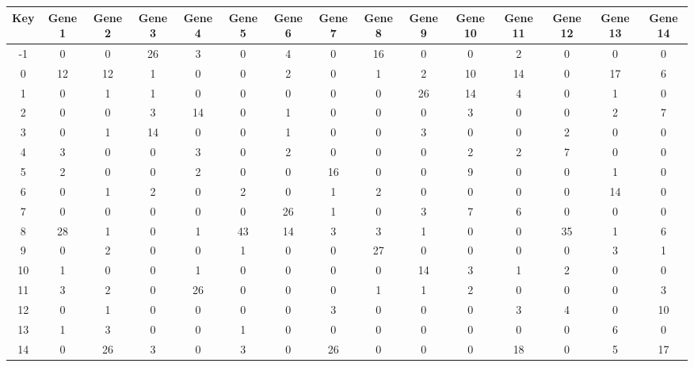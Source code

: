 \begin{tabular}{|c|c|c|c|c|c|c|c|c|c|c|c|c|c|c|}
\hline
Key & Gene 1 & Gene 2 & Gene 3 & Gene 4 & Gene 5 & Gene 6 & Gene 7 & Gene 8 & Gene 9 & Gene 10 & Gene 11 & Gene 12 & Gene 13 & Gene 14 \\
\hline
-1 & 0 & 0 & 26 & 3 & 0 & 4 & 0 & 16 & 0 & 0 & 2 & 0 & 0 & 0 \\
0 & 12 & 12 & 1 & 0 & 0 & 2 & 0 & 1 & 2 & 10 & 14 & 0 & 17 & 6 \\
1 & 0 & 1 & 1 & 0 & 0 & 0 & 0 & 0 & 26 & 14 & 4 & 0 & 1 & 0 \\
2 & 0 & 0 & 3 & 14 & 0 & 1 & 0 & 0 & 0 & 3 & 0 & 0 & 2 & 7 \\
3 & 0 & 1 & 14 & 0 & 0 & 1 & 0 & 0 & 3 & 0 & 0 & 2 & 0 & 0 \\
4 & 3 & 0 & 0 & 3 & 0 & 2 & 0 & 0 & 0 & 2 & 2 & 7 & 0 & 0 \\
5 & 2 & 0 & 0 & 2 & 0 & 0 & 16 & 0 & 0 & 9 & 0 & 0 & 1 & 0 \\
6 & 0 & 1 & 2 & 0 & 2 & 0 & 1 & 2 & 0 & 0 & 0 & 0 & 14 & 0 \\
7 & 0 & 0 & 0 & 0 & 0 & 26 & 1 & 0 & 3 & 7 & 6 & 0 & 0 & 0 \\
8 & 28 & 1 & 0 & 1 & 43 & 14 & 3 & 3 & 1 & 0 & 0 & 35 & 1 & 6 \\
9 & 0 & 2 & 0 & 0 & 1 & 0 & 0 & 27 & 0 & 0 & 0 & 0 & 3 & 1 \\
10 & 1 & 0 & 0 & 1 & 0 & 0 & 0 & 0 & 14 & 3 & 1 & 2 & 0 & 0 \\
11 & 3 & 2 & 0 & 26 & 0 & 0 & 0 & 1 & 1 & 2 & 0 & 0 & 0 & 3 \\
12 & 0 & 1 & 0 & 0 & 0 & 0 & 3 & 0 & 0 & 0 & 3 & 4 & 0 & 10 \\
13 & 1 & 3 & 0 & 0 & 1 & 0 & 0 & 0 & 0 & 0 & 0 & 0 & 6 & 0 \\
14 & 0 & 26 & 3 & 0 & 3 & 0 & 26 & 0 & 0 & 0 & 18 & 0 & 5 & 17 \\
\hline
\end{tabular}